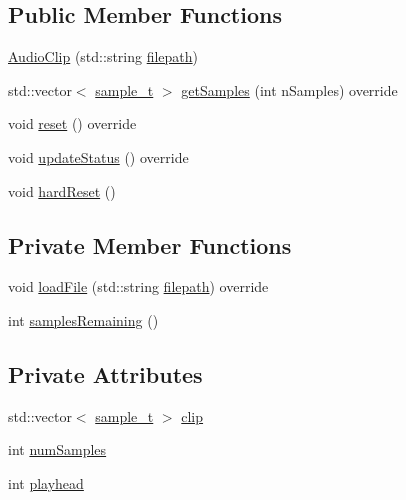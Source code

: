 \subsection*{Public Member Functions}
\begin{DoxyCompactItemize}
\item 
\hyperlink{classdrumpi_1_1audio_1_1AudioClip_aec77804b78d89a21cb789b80a013c4fc}{Audio\+Clip} (std\+::string \hyperlink{classdrumpi_1_1audio_1_1SampleSourceFile_a0d6461310f720bf9a25e7c274f57053b}{filepath})
\item 
std\+::vector$<$ \hyperlink{namespacedrumpi_1_1audio_aca0bdc9164f87b72057e284442abab6e}{sample\+\_\+t} $>$ \hyperlink{classdrumpi_1_1audio_1_1AudioClip_aad8e2b4282047c0fb884d4f93210c83b}{get\+Samples} (int n\+Samples) override
\item 
void \hyperlink{classdrumpi_1_1audio_1_1AudioClip_ac870bf37050afae302754c4e4671d779}{reset} () override
\item 
void \hyperlink{classdrumpi_1_1audio_1_1AudioClip_aeed08721b08d9443a769a99e717f5743}{update\+Status} () override
\item 
void \hyperlink{classdrumpi_1_1audio_1_1AudioClip_a9696d29532e37f6ea04c6353f0e3748b}{hard\+Reset} ()
\end{DoxyCompactItemize}
\subsection*{Private Member Functions}
\begin{DoxyCompactItemize}
\item 
void \hyperlink{classdrumpi_1_1audio_1_1AudioClip_af00b5d353bec63b6bbbbe58509b95fe3}{load\+File} (std\+::string \hyperlink{classdrumpi_1_1audio_1_1SampleSourceFile_a0d6461310f720bf9a25e7c274f57053b}{filepath}) override
\item 
int \hyperlink{classdrumpi_1_1audio_1_1AudioClip_a04519734485d53672fe56ddac590b428}{samples\+Remaining} ()
\end{DoxyCompactItemize}
\subsection*{Private Attributes}
\begin{DoxyCompactItemize}
\item 
std\+::vector$<$ \hyperlink{namespacedrumpi_1_1audio_aca0bdc9164f87b72057e284442abab6e}{sample\+\_\+t} $>$ \hyperlink{classdrumpi_1_1audio_1_1AudioClip_a3d99c707ac474917167a9936e09e620a}{clip}
\item 
int \hyperlink{classdrumpi_1_1audio_1_1AudioClip_a5ee7a6ff9e98c5c3f72ec72405d96e58}{num\+Samples}
\item 
int \hyperlink{classdrumpi_1_1audio_1_1AudioClip_ad901741b22d0efe60079054cb572f6f5}{playhead}
\end{DoxyCompactItemize}

